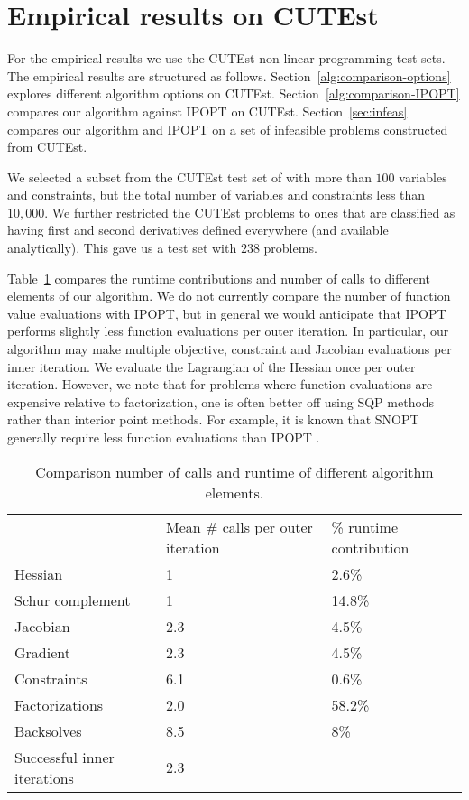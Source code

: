 \documentclass{article}
\begin{document}
\section{Empirical results on CUTEst}\label{sec:empirical-results}

For the empirical results we use the CUTEst non linear programming test sets. The empirical results are structured as follows. Section~\ref{alg:comparison-options} explores different algorithm options on CUTEst.  Section~\ref{alg:comparison-IPOPT} compares our algorithm against IPOPT on CUTEst. Section~\ref{sec:infeas} compares our algorithm and IPOPT on a set of infeasible problems constructed from CUTEst. %

We selected a subset from the CUTEst test set of with more than $100$ variables and constraints, but the total number of variables and constraints less than $10,000$. We further restricted the CUTEst problems to ones that are classified as having first and second derivatives defined everywhere (and available analytically). This gave us a test set with $238$ problems.

Table~\ref{avg:evaluations} compares the runtime contributions and number of calls to different elements of our algorithm. We do not currently compare the number of function value evaluations with IPOPT, but in general we would anticipate that IPOPT performs slightly less function evaluations per outer iteration. In particular, our algorithm may make multiple objective, constraint and Jacobian evaluations per inner iteration. We evaluate the Lagrangian of the Hessian once per outer iteration. However, we note that for problems where function evaluations are expensive relative to factorization, one is often better off using SQP methods rather than interior point methods. For example, it is known that SNOPT generally require less function evaluations than IPOPT \cite[Figure 2, Figure 3]{gill2015performance}. 


\begin{table}[H]
\begin{tabular}{l  p{3.0cm} l}
&   Mean \# calls per outer iteration & \% runtime contribution \\ 
Hessian & 1 & 2.6\% \\  
Schur complement &1 & 14.8\% \\
Jacobian & 2.3 & 4.5\%  \\
Gradient & 2.3 & 4.5\%  \\
Constraints & 6.1 & 0.6\% \\
Factorizations & 2.0  & 58.2\%  \\
Backsolves & 8.5 & 8\% \\
Successful inner iterations & 2.3 & \\
\end{tabular}
\caption{Comparison number of calls and runtime of different algorithm elements.}\label{avg:evaluations}
\end{table}
\end{document}
